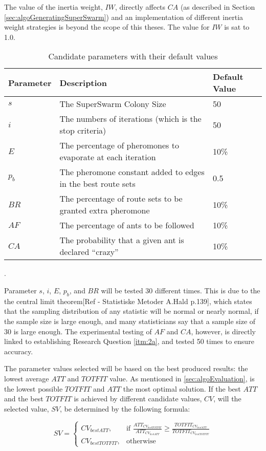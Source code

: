 The value of the inertia weight, $IW$, directly affects $CA$ (as described in Section \vref{sec:algoGeneratingSuperSwarm}) and an implementation of different inertia weight strategies is beyond the scope of this theses. The value for $IW$ is sat to 1.0. 

\begin{table}[H]
	\small
	\begin{tabular}{|l|l|l|}
    	\hline
    	Parameter & Description & Default Value\\
    	\hline
    	$s$ & The SuperSwarm Colony Size & 50\\
    	$i$ & The numbers of iterations (which is the stop criteria) & 50\\
    	$E$ & The percentage of pheromones to evaporate at each iteration & 10\%\\
    	$p_b$ & The pheromone constant added to edges in the best route sets & 0.5\\
    	$BR$ & The percentage of route sets to be granted extra pheromone & 10\%\\
    	$AF$ & The percentage of ants to be followed & 10\%\\
    	$CA$ & The probability that a given ant is declared ``crazy'' & 10\%\\
   	    \hline
    \end{tabular}
    \caption {Candidate parameters with their default values}.
    \label{table:parameters}
\end{table}

Parameter $s$, $i$, $E$, $p_b$, and $BR$  will be tested 30 different times. This is due to the the central limit theorem[Ref - Statistiske Metoder A.Hald p.139], which states that the sampling distribution of any statistic will be normal or nearly normal, if the sample size is large enough, and many statisticians say that a sample size of 30 is large enough. The experimental testing of $AF$ and $CA$, however, is directly linked to establishing Research Question \vref{itm:2a}, and tested 50 times to ensure accuracy.

The parameter values selected will be based on the best produced results: the lowest average $ATT$ and $TOTFIT$ value. As mentioned in \vref{sec:algoEvaluation}, is the lowest possible $TOTFIT$ and $ATT$ the most optimal solution. If the best $ATT$ and the best $TOTFIT$ is achieved by different candidate values, $CV$, will the selected value, $SV$, be determined by the following formula:

\[
    SV= 
\begin{cases}
    CV_{bestATT},& \text{if } \frac{ATT_{CV_{bestTOTFIT}}}{ATT_{CV_{bestATT}}}\geq \frac{TOTFIT_{CV_{bestATT}}}{TOTFIT_{CV_{bestTOTFIT}}}\\
    CV_{bestTOTFIT},& \text{otherwise}
\end{cases}
\]


